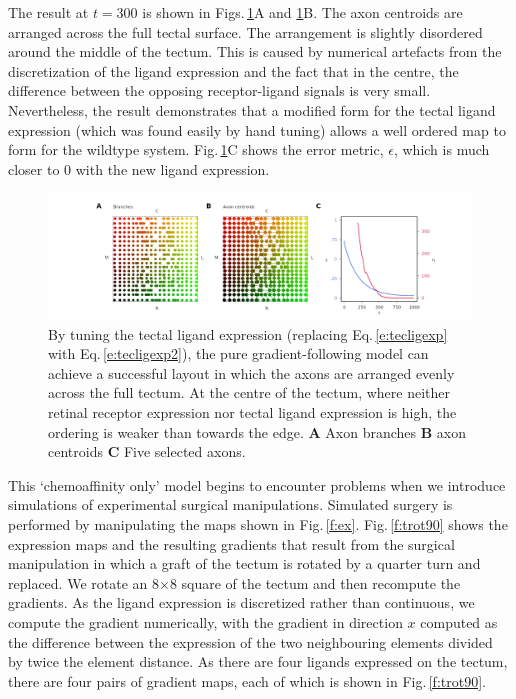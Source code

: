\documentclass[11pt, a4paper, draft]{article}
\begin{document}
The result at $t=300$ is shown in Figs.\,\ref{f:G0}A
and \ref{f:G0}B. The axon centroids are arranged across the full tectal
surface.  The arrangement is slightly disordered around the middle of the
tectum. This is caused by numerical artefacts from the discretization of the
ligand expression and the fact that in the centre, the difference between the
opposing receptor-ligand signals is very small. Nevertheless, the result
demonstrates that a modified form for the tectal ligand expression (which was
found easily by hand tuning) allows a well ordered map to form for the
wildtype system. Fig.\,\ref{f:G0}C shows the error metric, $\epsilon$,
which is much closer to 0 with the new ligand expression.

\begin{figure}
\includegraphics[width=\linewidth]{./images/j4_eE_G_wt_fig3.png}
\caption{By tuning the tectal ligand expression (replacing Eq.\,\ref{e:tecligexp} with
 Eq.\,\ref{e:tecligexp2}), the pure gradient-following model can achieve a
 successful layout in which the axons are arranged evenly across the full
 tectum. At the centre of the tectum, where neither retinal receptor
 expression nor tectal ligand expression is high, the ordering is weaker than
 towards the edge. \textbf{A} Axon branches \textbf{B} axon
 centroids \textbf{C} Five selected axons.}
\label{f:G0}
\end{figure}

This `chemoaffinity only' model begins to encounter problems when we introduce
simulations of experimental surgical manipulations. Simulated surgery is
performed by manipulating the maps shown in
Fig.\,\ref{f:ex}. Fig.\,\ref{f:trot90} shows the expression maps and the
resulting gradients that result from the surgical manipulation in which a
graft of the tectum is rotated by a quarter turn and replaced. We rotate an
8$\times$8 square of the tectum and then recompute the gradients. As the ligand
expression is discretized rather than continuous, we compute the gradient
numerically, with the gradient in direction $x$ computed as the difference
between the expression of the two neighbouring elements divided by twice the
element distance. As there are four ligands expressed on the tectum, there are
four pairs of gradient maps, each of which is shown in Fig.\,\ref{f:trot90}.
\end{document}
